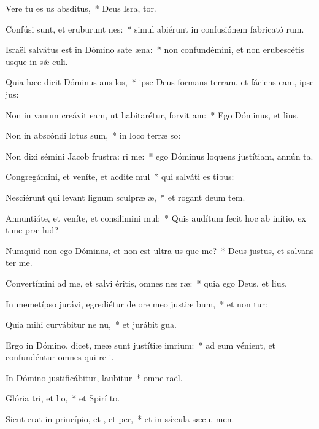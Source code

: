 \item Vere tu es us absditus,~* Deus Isra, tor.
\item Confúsi sunt, et eruburunt nes:~* simul abiérunt in confusiónem fabricató rum.
\item Israël salvátus est in Dómino sate æna:~* non confundémini, et non erubescétis usque in sǽ culi.
\item Quia hæc dicit Dóminus ans los,~* ipse Deus formans terram, et fáciens eam, ipse  jus:
\item Non in vanum creávit eam, ut habitarétur, forvit am:~* Ego Dóminus, et   lius.
\item Non in abscóndi lotus sum,~* in loco terræ so:
\item Non dixi sémini Jacob frustra: ri me:~* ego Dóminus loquens justítiam, annún ta.
\item Congregámini, et veníte, et acdite mul~* qui salváti es  tibus:
\item Nesciérunt qui levant lignum sculpræ æ,~* et rogant deum  tem.
\item Annuntiáte, et veníte, et consilimini mul:~* Quis audítum fecit hoc ab inítio, ex tunc præ lud?
\item Numquid non ego Dóminus, et non est ultra us que me?~* Deus justus, et salvans   ter me.
\item Convertímini ad me, et salvi éritis, omnes nes ræ:~* quia ego Deus, et   lius.
\item In memetípso jurávi, egrediétur de ore meo justiæ bum,~* et non tur:
\item Quia mihi curvábitur ne nu,~* et jurábit  gua.
\item Ergo in Dómino, dicet, meæ sunt justítiæ  imrium:~* ad eum vénient, et confundéntur omnes qui re i.
\item In Dómino justificábitur,  laubitur~* omne  raël.
\item Glória tri, et lio,~* et Spirí to.
\item Sicut erat in princípio, et , et per,~* et in sǽcula sæcu. men.
